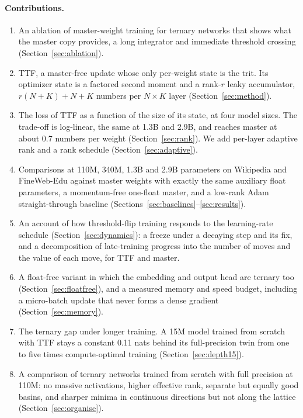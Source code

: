 \documentclass[10pt,twocolumn]{article}
\begin{document}
\paragraph{Contributions.}
\begin{enumerate}
\item An ablation of master-weight training for ternary networks that shows what the master copy provides, a long
  integrator and immediate threshold crossing (Section~\ref{sec:ablation}).
\item TTF, a master-free update whose only per-weight state is the trit. Its optimizer state is a factored second moment
  and a rank-$r$ leaky accumulator, $r(N+K)+N+K$ numbers per $N\times K$ layer (Section~\ref{sec:method}).
\item The loss of TTF as a function of the size of its state, at four model sizes. The trade-off is log-linear, the same
  at 1.3B and 2.9B, and reaches master at about 0.7 numbers per weight (Section~\ref{sec:rank}). We add per-layer
  adaptive rank and a rank schedule (Section~\ref{sec:adaptive}).
\item Comparisons at 110M, 340M, 1.3B and 2.9B parameters on Wikipedia and FineWeb-Edu against master weights with
  exactly the same auxiliary float parameters, a momentum-free one-float master, and a low-rank Adam straight-through
  baseline (Sections~\ref{sec:baselines}--\ref{sec:results}).
\item An account of how threshold-flip training responds to the learning-rate schedule (Section~\ref{sec:dynamics}): a
  freeze under a decaying step and its fix, and a decomposition of late-training progress into the number of moves and
  the value of each move, for TTF and master.
\item A float-free variant in which the embedding and output head are ternary too (Section~\ref{sec:floatfree}), and a
  measured memory and speed budget, including a micro-batch update that never forms a dense gradient
  (Section~\ref{sec:memory}).
\item The ternary gap under longer training. A 15M model trained from scratch with TTF stays a constant 0.11 nats
  behind its full-precision twin from one to five times compute-optimal training (Section~\ref{sec:depth15}).
\item A comparison of ternary networks trained from scratch with full precision at 110M: no massive activations,
  higher effective rank, separate but equally good basins, and sharper minima in continuous directions but not along
  the lattice (Section~\ref{sec:organise}).
\end{enumerate}
\end{document}
